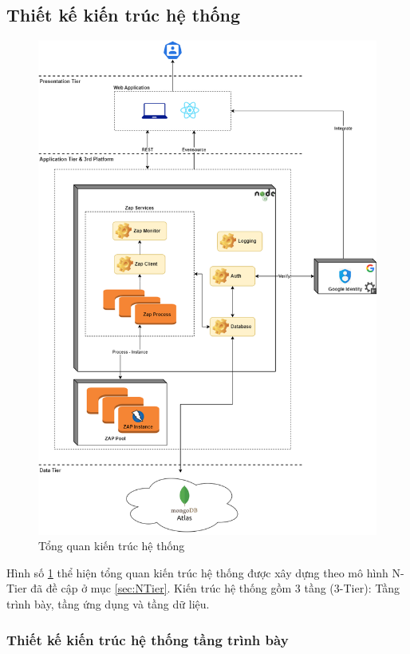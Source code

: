 \subsection{Thiết kế kiến trúc hệ thống}
\begin{figure}[H]
      \centering
      \includegraphics[width=\textwidth]{applied-thesis-chapters/chapter-3/Tổng quan kiến trúc hệ thống.png}
      \caption{Tổng quan kiến trúc hệ thống}
      \label{fig:KienTrucHeThong}
\end{figure}
\tab Hình số \ref{fig:KienTrucHeThong} thể hiện tổng quan kiến trúc hệ thống được xây dựng theo mô hình N-Tier đã đề cập ở mục \ref{sec:NTier}.
Kiến trúc hệ thống gồm 3 tầng (3-Tier): Tầng trình bày, tầng ứng dụng và tầng dữ liệu.

\subsubsection{Thiết kế kiến trúc hệ thống tầng trình bày}

